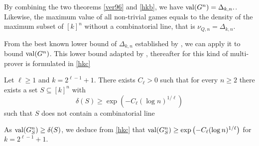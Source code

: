  By combining the two theorems \eqref{ver96} and \eqref{hkb}, we have $\mathrm{val} (G^n)=\Delta_{k,n}.$. Likewise, the maximum  value of  all non-trivial games equals to the density of the maximum subset of $[k]^n$ without a combinatorial line, that is $\nu_{Q,n}=\Delta_{k,n}.$
 
From the best known lower bound of $\Delta_{k,n}$ established by \cite{polymath2010density}, we can apply it to bound $\mathrm{val} (G^n)$. This lower bound adapted by \cite{hkazla2016forbidden}, thereafter for this kind of multi-prover is formulated in \eqref{hkc}
 
 \begin{thm}Let $\ell \geq 1$ and $k=2^{\ell-1}+1.$ There exists $C_{\ell} >0$ such that for every $n\geq 2$ there exists a set $S \subseteq [k]^n$ with $$ \delta(S) \geq \exp \left( -C_{\ell} (\log n)^{1/\ell} \right)$$	 such that $S$ does not contain a combinatorial line  \label{hkc}	\end{thm}

 As $\mathrm{val} (G_S^n) \geq  \delta(S)$, we deduce from \eqref{hkc} that  $\mathrm{val} (G_S^n) \geq  \exp \left( -C_{\ell} (\log n)^{1/\ell} \right)$ for $k=2^{\ell-1}+1.$

 
 
 
 
 
 